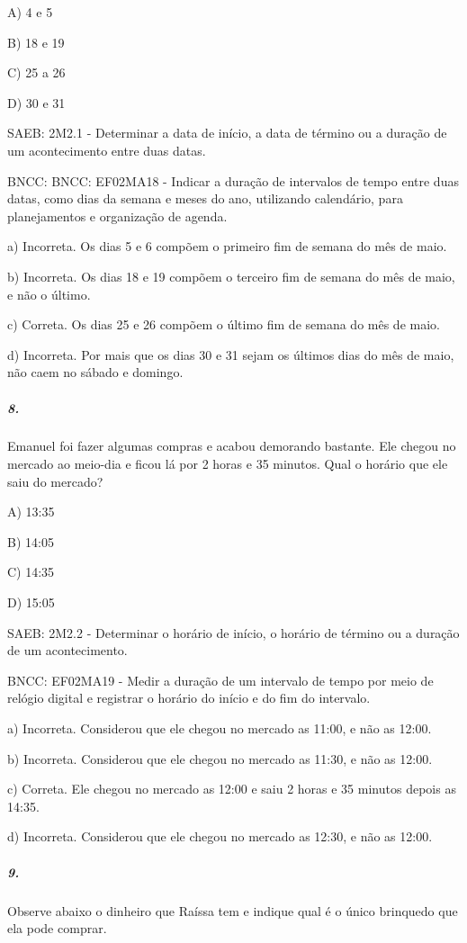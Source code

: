 A) 4 e 5

B) 18 e 19

C) 25 a 26

D) 30 e 31

SAEB: 2M2.1 - Determinar a data de início, a data de término ou a
duração de um acontecimento entre duas datas.

BNCC: BNCC: EF02MA18 - Indicar a duração de intervalos de tempo entre
duas datas, como dias da semana e meses do ano, utilizando calendário,
para planejamentos e organização de agenda.

a) Incorreta. Os dias 5 e 6 compõem o primeiro fim de semana do mês de
maio.

b) Incorreta. Os dias 18 e 19 compõem o terceiro fim de semana do mês de
maio, e não o último.

c) Correta. Os dias 25 e 26 compõem o último fim de semana do mês de
maio.

d) Incorreta. Por mais que os dias 30 e 31 sejam os últimos dias do mês
de maio, não caem no sábado e domingo.

\subparagraph{8. }\label{section-152}

Emanuel foi fazer algumas compras e acabou demorando bastante. Ele
chegou no mercado ao meio-dia e ficou lá por 2 horas e 35 minutos. Qual
o horário que ele saiu do mercado?

A) 13:35

B) 14:05

C) 14:35

D) 15:05

SAEB: 2M2.2 - Determinar o horário de início, o horário de término ou a
duração de um acontecimento.

BNCC: EF02MA19 - Medir a duração de um intervalo de tempo por meio de
relógio digital e registrar o horário do início e do fim do intervalo.

a) Incorreta. Considerou que ele chegou no mercado as 11:00, e não as
12:00.

b) Incorreta. Considerou que ele chegou no mercado as 11:30, e não as
12:00.

c) Correta. Ele chegou no mercado as 12:00 e saiu 2 horas e 35 minutos
depois as 14:35.

d) Incorreta. Considerou que ele chegou no mercado as 12:30, e não as
12:00.

\subparagraph{9. }\label{section-153}

Observe abaixo o dinheiro que Raíssa tem e indique qual é o único
brinquedo que ela pode comprar.

